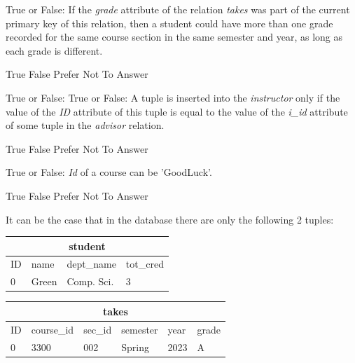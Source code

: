 \documentclass[12pt, addpoints, answers]{exam}
\begin{document}
\begin{questions}
\begin{minipage}{\linewidth}
\question[3]
True or False: If the \textit{grade} attribute of the relation \textit{takes} was part of the current primary key of this relation, 
then a student could have more than one grade recorded for the same course section in the same semester and year, 
as long as each grade is different.\par\vspace{0.5em}
\begin{checkboxes}
    \CorrectChoice True
    \choice False
    \CorrectChoice Prefer Not To Answer
\end{checkboxes}
\end{minipage}\vspace{1em}

\begin{minipage}{\linewidth}
\question[3]
True or False: True or False: A tuple is inserted into the \textit{instructor} only if the value of the \textit{ID} attribute of this tuple is 
equal to the value of the \textit{i\_id} attribute of some tuple in the \textit{advisor} relation.\par\vspace{0.5em}
\begin{checkboxes}
    \choice True
    \CorrectChoice False
    \CorrectChoice Prefer Not To Answer
\end{checkboxes}
\end{minipage}\vspace{1em}

\begin{minipage}{\linewidth}
\question[3]
True or False: \textit{Id} of a course can be 'GoodLuck'.\par\vspace{0.5em}
\begin{checkboxes}
    \CorrectChoice True
    \choice False
    \CorrectChoice Prefer Not To Answer
\end{checkboxes}
\end{minipage}\vspace{1em}

\begin{minipage}{\linewidth}
\question[2]
It can be the case that in the database there are only the following 2 tuples:\par\vspace{0.5em}
\begin{tabular}{|l|l|l|l|}
\hline
\multicolumn{4}{|c|}{\textbf{student}} \\
\hline
ID & name & dept\_name & tot\_cred \\
\hline
0 & Green & Comp. Sci. & 3 \\
\hline
\end{tabular}
\par\vspace{1em}
\begin{tabular}{|l|l|l|l|l|l|}
\hline
\multicolumn{6}{|c|}{\textbf{takes}} \\
\hline
ID & course\_id & sec\_id & semester & year & grade \\
\hline
0 & 3300 & 002 & Spring & 2023 & A \\
\hline
\end{tabular}


\end{minipage}
\end{questions}
\end{document}
